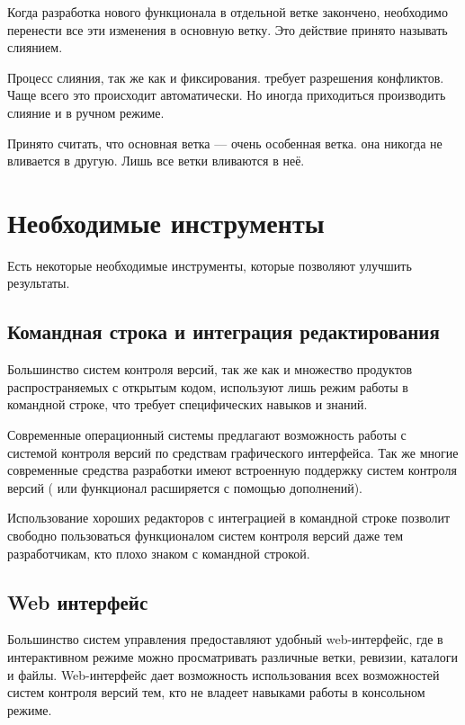   Когда разработка нового функционала в отдельной ветке закончено, необходимо перенести все эти изменения в основную ветку. Это действие принято называть слиянием.
  
 
 Процесс слияния, так же как и фиксирования. требует  разрешения конфликтов. Чаще всего это происходит автоматически. Но иногда приходиться производить слияние и в ручном режиме.

Принято считать, что основная ветка --- очень особенная ветка. она никогда не вливается в другую. Лишь все ветки вливаются в неё.


\section{ Необходимые инструменты} \label{sect3_3}

Есть некоторые необходимые инструменты, которые позволяют улучшить результаты.

\subsection{ Командная строка и интеграция редактирования } \label{sect3_3_1}

Большинство систем контроля версий, так же как и множество продуктов распространяемых с открытым кодом, используют лишь режим работы в командной строке, что требует специфических навыков и знаний.

Современные операционный системы предлагают возможность работы с системой контроля версий по средствам графического интерфейса. Так же многие современные средства разработки имеют встроенную поддержку систем контроля версий ( или функционал расширяется с помощью дополнений).

Использование хороших редакторов  с интеграцией в командной строке позволит свободно пользоваться функционалом систем контроля версий даже тем разработчикам, кто плохо знаком с командной строкой.


\subsection{ Web интерфейс } \label{sect3_3_2}

Большинство систем управления предоставляют удобный web-интерфейс, где в интерактивном режиме можно просматривать различные ветки, ревизии, каталоги и файлы. Web-интерфейс дает возможность использования всех возможностей систем контроля версий тем, кто не владеет навыками работы в консольном режиме.

